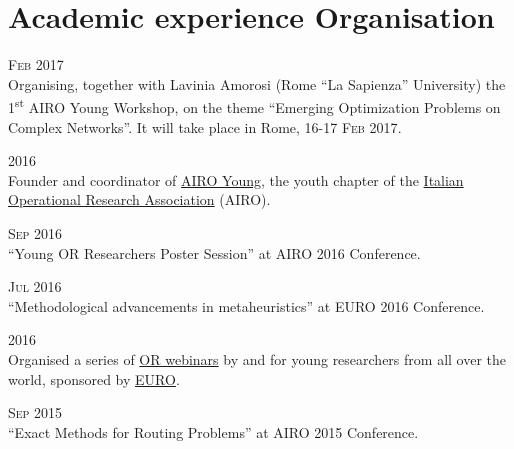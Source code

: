 \section*{Academic experience {\small Organisation}}

\begin{paracol}{2}
    \textsc{Feb 2017}
\switchcolumn
    \\
    Organising, together with Lavinia Amorosi (Rome ``La Sapienza'' University) the 1\textsuperscript{st} AIRO Young Workshop, on the theme ``Emerging Optimization Problems on Complex Networks''. It will take place in Rome, \textsc{16-17 Feb 2017}.
\end{paracol}

\begin{paracol}{2}
  \textsc{2016}
\switchcolumn
  \\
  Founder and coordinator of \href{http://airoyoung.org}{AIRO Young}, the youth chapter of the \href{http://www.airo.org}{Italian Operational Research Association} (AIRO).
\end{paracol}

\begin{paracol}{2}
  \textsc{Sep 2016}
\switchcolumn
  \\
  ``Young OR Researchers Poster Session'' at AIRO 2016 Conference.
\end{paracol}

\begin{paracol}{2}
  \textsc{Jul 2016}
\switchcolumn
  \\
  ``Methodological advancements in metaheuristics'' at EURO 2016 Conference.
\end{paracol}

\begin{paracol}{2}
    \textsc{2016}
\switchcolumn
  \\
  Organised a series of \href{http://santini.in/seminars}{OR webinars} by and for young researchers from all over the world, sponsored by \href{http://euro-online.org}{EURO}.
\end{paracol}

\begin{paracol}{2}
  \textsc{Sep 2015}
\switchcolumn
  \\
  ``Exact Methods for Routing Problems'' at AIRO 2015 Conference.
\end{paracol}

